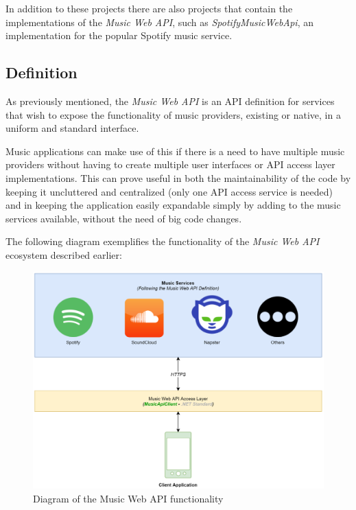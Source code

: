 In addition to these projects there are also projects that contain the implementations of the \textit{Music Web API}, such as \textit{SpotifyMusicWebApi}, an implementation for the popular Spotify music service.

\subsection{Definition}
As previously mentioned, the \textit{Music Web API} is an API definition for services that wish to expose the functionality of music providers, existing or native, in a uniform and standard interface.

Music applications can make use of this if there is a need to have multiple music providers without having to create multiple user interfaces or API access layer implementations. This can prove useful in both the maintainability of the code by keeping it uncluttered and centralized (only one API access service is needed) and in keeping the application easily expandable simply by adding to the music services available, without the need of big code changes.

The following diagram exemplifies the functionality of the \textit{Music Web API} ecosystem described earlier:

\begin{figure}[!ht]
	\centering
	\includegraphics[width=1\textwidth,height=.45\textheight]{./Chapter3/Figures/MusicWebApi/MusicApiDiagram.png}
	\caption{Diagram of the Music Web API functionality}
	\label{fig:MusicApiDiagram}
\end{figure}

